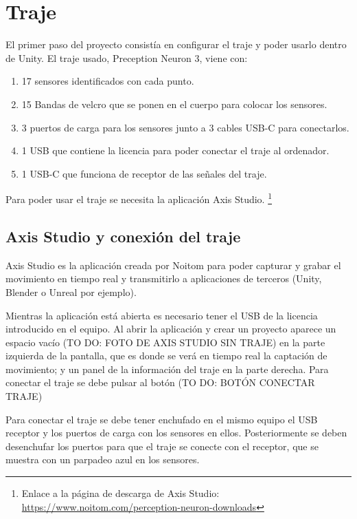 \section{Traje}
\label{sec:traje}

El primer paso del proyecto consistía en configurar el traje y poder usarlo dentro de Unity.
El traje usado, Preception Neuron 3, viene con:

\begin{enumerate}  
    \renewcommand{\theenumi}{\alph{enumi}}
    \item 17 sensores identificados con cada punto.
    \item 15 Bandas de velcro que se ponen en el cuerpo para colocar los sensores.
    \item 3 puertos de carga para los sensores junto a 3 cables USB-C para conectarlos.
    \item 1 USB que contiene la licencia para poder conectar el traje al ordenador.
    \item 1 USB-C que funciona de receptor de las señales del traje.
\end{enumerate}

Para poder usar el traje se necesita la aplicación Axis Studio. \footnote{Enlace a la página de descarga de Axis Studio: \url{https://www.noitom.com/perception-neuron-downloads}}
\subsection{Axis Studio y conexión del traje}
Axis Studio es la aplicación creada por Noitom para poder capturar y grabar el movimiento en tiempo real y transmitirlo a aplicaciones de terceros (Unity, Blender o Unreal por ejemplo).

Mientras la aplicación está abierta es necesario tener el USB de la licencia introducido en el equipo.
Al abrir la aplicación y crear un proyecto aparece un espacio vacío (TO DO: FOTO DE AXIS STUDIO SIN TRAJE) en la parte izquierda de la pantalla, que es donde se verá en tiempo real la captación de movimiento; y un panel de la información del traje en la parte derecha. Para conectar el traje se debe pulsar al botón (TO DO: BOTÓN CONECTAR TRAJE)

Para conectar el traje se debe tener enchufado en el mismo equipo el USB receptor y los puertos de carga con los sensores en ellos.
Posteriormente se deben desenchufar los puertos para que el traje se conecte con el receptor, que se muestra con un parpadeo azul en los sensores.

